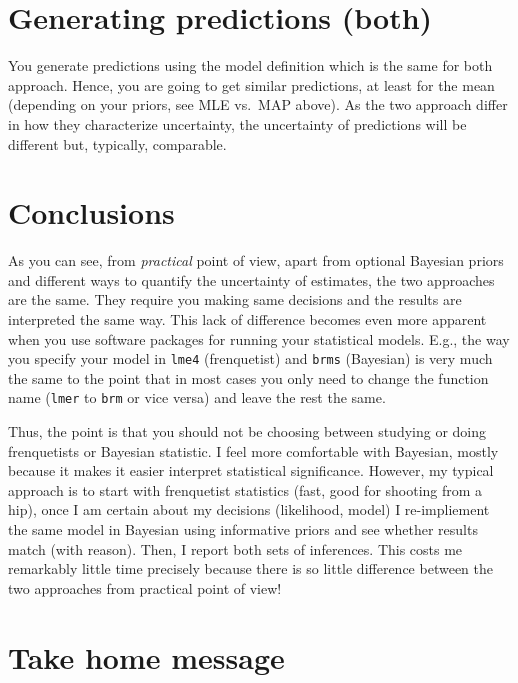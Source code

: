 \documentclass[
]{book}
\begin{document}
\hypertarget{generating-predictions-both}{%
\section{Generating predictions (both)}\label{generating-predictions-both}}

You generate predictions using the model definition which is the same for both approach. Hence, you are going to get similar predictions, at least for the mean (depending on your priors, see MLE vs.~MAP above). As the two approach differ in how they characterize uncertainty, the uncertainty of predictions will be different but, typically, comparable.

\hypertarget{conclusions}{%
\section{Conclusions}\label{conclusions}}

As you can see, from \emph{practical} point of view, apart from optional Bayesian priors and different ways to quantify the uncertainty of estimates, the two approaches are the same. They require you making same decisions and the results are interpreted the same way. This lack of difference becomes even more apparent when you use software packages for running your statistical models. E.g., the way you specify your model in \texttt{lme4} (frenquetist) and \texttt{brms} (Bayesian) is very much the same to the point that in most cases you only need to change the function name (\texttt{lmer} to \texttt{brm} or vice versa) and leave the rest the same.

Thus, the point is that you should not be choosing between studying or doing frenquetists or Bayesian statistic. I feel more comfortable with Bayesian, mostly because it makes it easier interpret statistical significance. However, my typical approach is to start with frenquetist statistics (fast, good for shooting from a hip), once I am certain about my decisions (likelihood, model) I re-impliement the same model in Bayesian using informative priors and see whether results match (with reason). Then, I report both sets of inferences. This costs me remarkably little time precisely because there is so little difference between the two approaches from practical point of view!

\hypertarget{take-home-message}{%
\section{Take home message}\label{take-home-message}}
\end{document}
